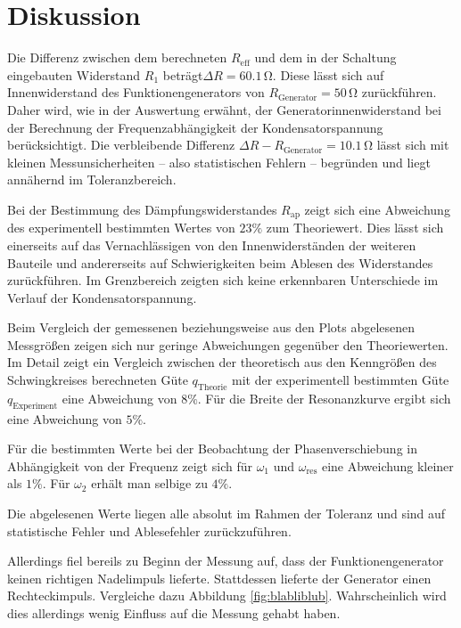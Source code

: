 \section{Diskussion}
\label{sec:Diskussion}
Die Differenz zwischen dem berechneten $R_\text{eff}$ und dem in der Schaltung eingebauten Widerstand $R_\text{1}$ beträgt$\Delta R=60.1 \,\si{\ohm}$.
Diese lässt sich auf Innenwiderstand des Funktionengenerators von $R_{\mathrm{Generator}}=50\,\si{\ohm}$ zurückführen.
Daher wird, wie in der Auswertung erwähnt, der Generatorinnenwiderstand bei der Berechnung der Frequenzabhängigkeit der Kondensatorspannung berücksichtigt.
Die verbleibende Differenz $\Delta R-R_{\mathrm{Generator}}=10.1 \,\si{\ohm}$ lässt sich mit kleinen Messunsicherheiten -- also statistischen Fehlern -- begründen und liegt annähernd im Toleranzbereich.

Bei der Bestimmung des Dämpfungswiderstandes $R_{\mathrm{ap}}$ zeigt sich eine Abweichung
des experimentell bestimmten Wertes von $23\%$ zum Theoriewert. Dies lässt sich einerseits
auf das Vernachlässigen von den Innenwiderständen der weiteren Bauteile und
andererseits auf Schwierigkeiten beim Ablesen des Widerstandes zurückführen. Im Grenzbereich zeigten
sich keine erkennbaren Unterschiede im Verlauf der Kondensatorspannung.

Beim Vergleich der gemessenen beziehungsweise aus den Plots abgelesenen Messgrößen zeigen sich nur geringe Abweichungen gegenüber den Theoriewerten.
Im Detail zeigt ein Vergleich zwischen der theoretisch aus den Kenngrößen des Schwingkreises berechneten Güte $q_\mathrm{Theorie}$ mit der experimentell bestimmten Güte $q_\mathrm{Experiment}$ eine Abweichung von $8\%$.
Für die Breite der Resonanzkurve ergibt sich eine Abweichung von $5\%$.

Für die bestimmten Werte bei der Beobachtung der Phasenverschiebung in Abhängigkeit von der
Frequenz zeigt sich für $\omega_1$ und $\omega_{\mathrm{res}}$ eine Abweichung kleiner als $1\%$. Für $\omega_2$ erhält man selbige zu $4\%$.

Die abgelesenen Werte liegen alle absolut im Rahmen der Toleranz und sind auf statistische Fehler
und Ablesefehler zurückzuführen.

Allerdings fiel bereils zu Beginn der Messung auf, dass der Funktionengenerator keinen richtigen Nadelimpuls lieferte. Stattdessen lieferte der Generator einen Rechteckimpuls. Vergleiche dazu Abbildung \ref{fig:blabliblub}.
Wahrscheinlich wird dies allerdings wenig Einfluss auf die Messung gehabt haben.

